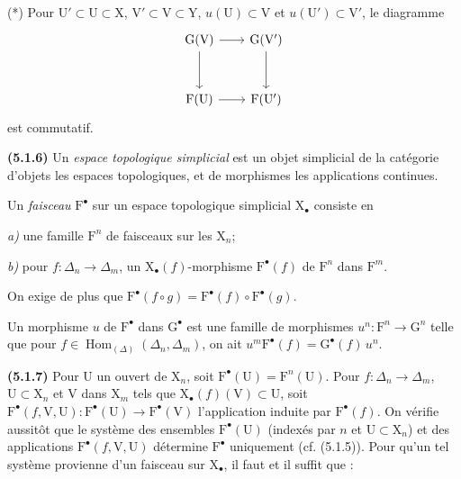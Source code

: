 \documentclass[11pt,leqno]{article}
\begin{document}
\noindent (*) Pour \(\mathrm{U}'\subset\mathrm{U}\subset\mathrm{X}\), \(\mathrm{V}'\subset\mathrm{V}\subset\mathrm{Y}\), \(u(\mathrm{U})\subset\mathrm{V}\) et \(u(\mathrm{U}')\subset\mathrm{V}'\), le diagramme
\[
\begin{tikzcd}[column sep=2em, row sep=3em]
\mathrm{G}(\mathrm{V}) \arrow[r] \arrow[d]
  & \mathrm{G}(\mathrm{V}') \arrow[d] \\
\mathrm{F}(\mathrm{U}) \arrow[r]
  & \mathrm{F}(\mathrm{U}')
\end{tikzcd}
\]
est commutatif.

\textbf{(5.1.6)} Un \textit{espace topologique simplicial} est un objet simplicial de la catégorie d’objets les espaces topologiques, et de morphismes les applications continues.

Un \textit{faisceau} \(\mathrm{F}^{\bullet}\) sur un espace topologique simplicial \(\mathrm{X}_{\bullet}\) consiste en

\noindent\textit{a)} une famille \(\mathrm{F}^n\) de faisceaux sur les \(\mathrm{X}_n\);\par
\noindent\textit{b)} pour \(f:\Delta_n\to\Delta_m\), un \(\mathrm{X}_{\bullet}(f)\)-morphisme \(\mathrm{F}^{\bullet}(f)\) de \(\mathrm{F}^n\) dans \(\mathrm{F}^m\).\par

On exige de plus que \(\mathrm{F}^{\bullet}(f\circ g)=\mathrm{F}^{\bullet}(f)\circ\mathrm{F}^{\bullet}(g)\).

Un morphisme \(u\) de \(\mathrm{F}^{\bullet}\) dans \(\mathrm{G}^{\bullet}\) est une famille de morphismes \(u^n:\mathrm{F}^n\to\mathrm{G}^n\) telle que pour \(f\in\operatorname{Hom}_{(\Delta)}(\Delta_n,\Delta_m)\), on ait \(u^m\mathrm{F}^{\bullet}(f)=\mathrm{G}^{\bullet}(f)\,u^n\).

\textbf{(5.1.7)} Pour \(\mathrm{U}\) un ouvert de \(\mathrm{X}_n\), soit \(\mathrm{F}^{\bullet}(\mathrm{U})=\mathrm{F}^n(\mathrm{U})\). Pour \(f:\Delta_n\to\Delta_m\), \(\mathrm{U}\subset\mathrm{X}_n\) et \(\mathrm{V}\) dans \(\mathrm{X}_m\) tels que \(\mathrm{X}_{\bullet}(f)(\mathrm{V})\subset\mathrm{U}\), soit \(\mathrm{F}^{\bullet}(f,\mathrm{V},\mathrm{U}):\mathrm{F}^{\bullet}(\mathrm{U})\to\mathrm{F}^{\bullet}(\mathrm{V})\) l’application induite par \(\mathrm{F}^{\bullet}(f)\). On vérifie aussitôt que le système des ensembles \(\mathrm{F}^{\bullet}(\mathrm{U})\) (indexés par \(n\) et \(\mathrm{U}\subset\mathrm{X}_n\)) et des applications \(\mathrm{F}^{\bullet}(f,\mathrm{V},\mathrm{U})\) détermine \(\mathrm{F}^{\bullet}\) uniquement (cf. (5.1.5)). Pour qu’un tel système provienne d’un faisceau sur \(\mathrm{X}_{\bullet}\), il faut et il suffit que :
\end{document}

